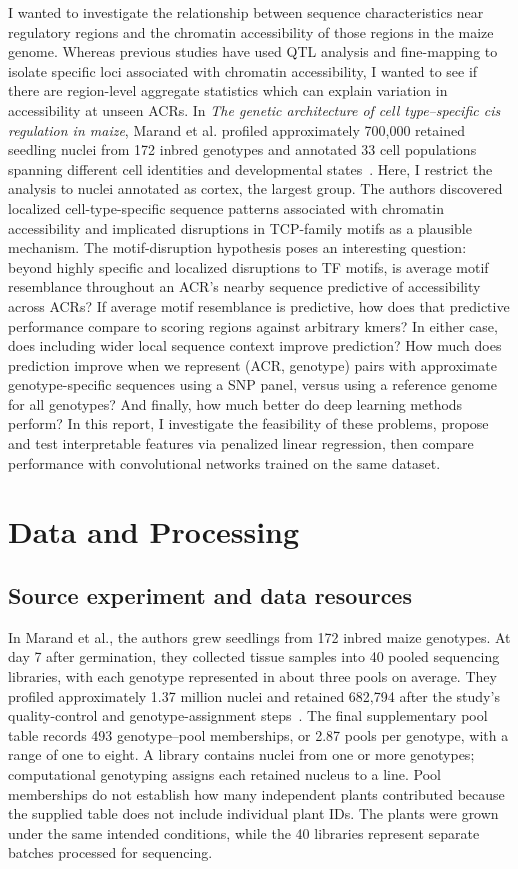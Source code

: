 \documentclass[10pt]{article}
\begin{document}
I wanted to investigate the relationship between sequence characteristics near regulatory regions and the chromatin accessibility of those regions in the maize genome. Whereas previous studies have used QTL analysis and fine-mapping to isolate specific loci associated with chromatin accessibility, I wanted to see if there are region-level aggregate  statistics which can explain variation in accessibility at unseen ACRs. In \textit{The genetic architecture of cell type--specific cis regulation in maize}, Marand et al. profiled approximately 700,000
retained seedling nuclei from 172 inbred genotypes and annotated
33 cell populations spanning different cell identities and
developmental states~\cite{marand}. Here, I restrict the analysis
to nuclei annotated as cortex, the largest group. The authors discovered localized cell-type-specific sequence patterns associated with chromatin accessibility and implicated disruptions in TCP-family motifs as a plausible mechanism. The motif-disruption hypothesis poses an interesting question: beyond highly specific and localized disruptions to TF motifs, is average motif resemblance throughout an ACR's nearby sequence predictive of accessibility across ACRs? If average motif resemblance is predictive, how does that predictive performance compare to scoring regions against arbitrary kmers?  In either case, does including wider local sequence context improve prediction? How much does prediction improve when we represent (ACR, genotype) pairs with approximate genotype-specific sequences using a SNP panel, versus using a reference genome for all genotypes? And finally, how much better do deep learning methods perform? In this report, I investigate the feasibility of these problems, propose and test interpretable features via penalized linear regression, then compare performance with convolutional networks trained on the same dataset. 

\section{Data and Processing}

\subsection{Source experiment and data resources}
In Marand et al., the authors grew seedlings from 172 inbred maize genotypes. At day 7 after germination, they collected tissue samples into 40 pooled sequencing libraries, with each genotype represented in about three pools on average. They profiled approximately 1.37 million nuclei and retained 682,794 after the study's quality-control and genotype-assignment steps~\cite{marand}. The final supplementary pool table records 493 genotype--pool memberships, or 2.87 pools per genotype, with a range of one to eight. A library contains nuclei from one or more genotypes; computational genotyping assigns each retained nucleus to a line. Pool memberships do not establish how many independent plants contributed because the supplied table does not include individual plant IDs. The plants were grown under the same intended conditions, while the 40 libraries represent separate batches processed for sequencing.
\end{document}
